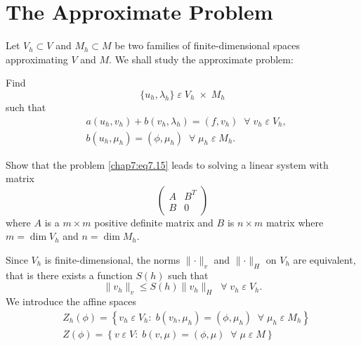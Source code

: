 \section{The Approximate Problem} \label{chap7:ssec7.2} 
Let
$V_h\subset V$ and $M_h\subset M$ be two families of
finite-dimensional spaces approximating $V$ and $M$. We shall study
the approximate problem:

Find
$$
\{u_h,\lambda_h\}\;\varepsilon\;V_h\;\times\;M_h
$$
such that 
\begin{align*}
& a(u_h,v_h)+b(v_h,\lambda_h)=(f,v_h)\; \; \forall\;v_h\;\varepsilon\;V_h,
\tag{7.15} \label{chap7:eq7.15}\\
& b(u_h,\mu_h)=(\phi,\mu_h)\; \; \forall\;\mu_h\;\varepsilon\;
M_h. \tag{7.15b} \label{chap7:eq7.15b}
\end{align*} \pageoriginale 

\setcounter{exercise}{0}
\begin{exercise}\label{chap7:exr1}
Show that the problem \eqref{chap7:eq7.15} leads to solving a linear
system with matrix 
\begin{equation*}
\begin{pmatrix}
A & B^T\\
B & 0
\end{pmatrix}
\end{equation*}
where $A$ is a $m\times m$ positive definite matrix and $B$ is
$n\times m$ matrix where $m=\dim V_h$ and $n=\dim M_h$. 

Since $V_h$ is finite-dimensional, the norms $\parallel
\cdotp\parallel_v$ and $\parallel\cdotp\parallel_H$ on $V_h$ are
equivalent, that is there exists a function $S(h)$ such that
\setcounter{equation}{15} 
\begin{equation}\label{chap7:eq7.16}
\parallel v_h\parallel_v\leq S(h)\parallel v_h\parallel_H
\; \; \forall\;v_h\;\varepsilon\;V_h. 
\end{equation}
We introduce the affine spaces 
\begin{align*}
& Z_h(\phi)=\left\{v_h\;\varepsilon\;V_h:\;b(v_h,\mu_h)=(\phi,\mu_h)\;
\; \forall\;\mu_h\;\varepsilon\;M_h\right\}\\
& Z(\phi)=\left\{v\;\varepsilon\;V:\;b(v,\mu)=(\phi,\mu)\; \; \forall
\;\mu\;\varepsilon\;M\right\} 
\end{align*}
\end{exercise}

